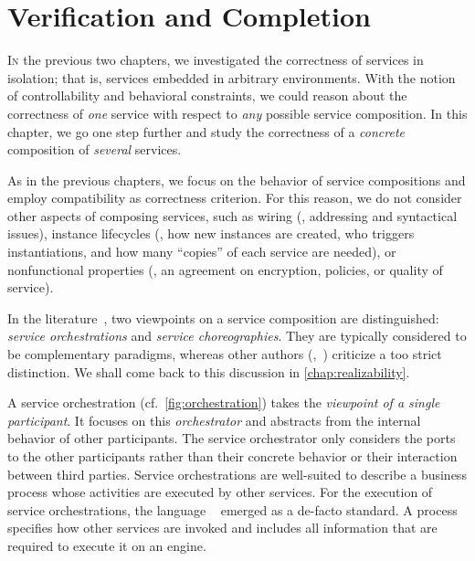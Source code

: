 \chapter{Verification and Completion}\label{chap:verification}


\lettrine[findent=.2em,lines=2,nindent=0pt]{I}{n} the previous two chapters, we investigated the correctness of services in isolation; that is, services embedded in arbitrary environments. With the notion of controllability and behavioral constraints, we could reason about the correctness of \emph{one} service with respect to \emph{any} possible service composition. In this chapter, we go one step further and study the correctness of a \emph{concrete} composition of \emph{several} services.

As in the previous chapters, we focus on the behavior of service compositions and employ compatibility as correctness criterion. For this reason, we do not consider other aspects of composing services, such as wiring (\ie, addressing and syntactical issues), instance lifecycles (\ie, how new instances are created, who triggers instantiations, and how many ``copies'' of each service are needed), or nonfunctional properties (\eg, an agreement on encryption, policies, or quality of service). 

In the literature~\cite{Peltz_2003_ieee,DijkmanD_2004_ijcis}, two viewpoints on a service composition are distinguished: \emph{service orchestrations} and \emph{service choreographies}. They are typically considered to be complementary paradigms, whereas other authors (\eg,~\cite{PapazoglouTDL_2007_ieee}) criticize a too strict distinction. We shall come back to this discussion in \autoref{chap:realizability}.

A service orchestration (cf.~\autoref{fig:orchestration}) takes the \emph{viewpoint of a single participant}. It focuses on this \emph{orchestrator} and abstracts from the internal behavior of other participants. The service orchestrator only considers the ports to the other participants rather than their concrete behavior or their interaction between third parties. Service orchestrations are well-suited to describe a business process whose activities are executed by other services. For the execution of service orchestrations, the language ~\cite{standard_bpel} emerged as a de-facto standard. A  process specifies how other services are invoked and includes all information that are required to execute it on an engine.

